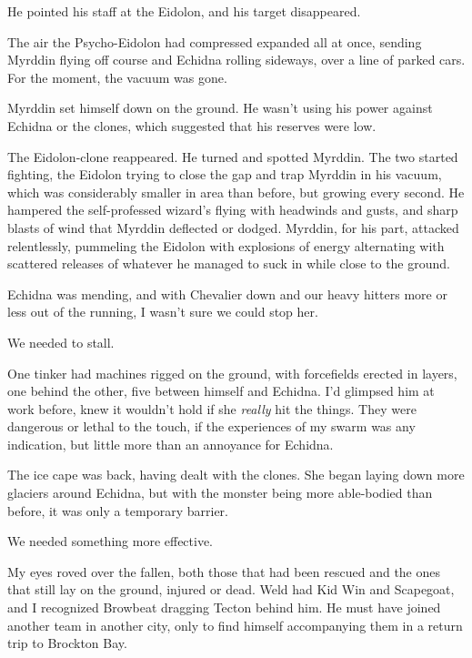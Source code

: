 He pointed his staff at the Eidolon, and his target disappeared.



The air the Psycho-Eidolon had compressed expanded all at once, sending Myrddin flying off course and Echidna rolling sideways, over a line of parked cars.  For the moment, the vacuum was gone.



Myrddin set himself down on the ground.  He wasn't using his power against Echidna or the clones, which suggested that his reserves were low.



The Eidolon-clone reappeared.  He turned and spotted Myrddin.  The two started fighting, the Eidolon trying to close the gap and trap Myrddin in his vacuum, which was considerably smaller in area than before, but growing every second.  He hampered the self-professed wizard's flying with headwinds and gusts, and sharp blasts of wind that Myrddin deflected or dodged.  Myrddin, for his part, attacked relentlessly, pummeling the Eidolon with explosions of energy alternating with scattered releases of whatever he managed to suck in while close to the ground.



Echidna was mending, and with Chevalier down and our heavy hitters more or less out of the running, I wasn't sure we could stop her.



We needed to stall.



One tinker had machines rigged on the ground, with forcefields erected in layers, one behind the other, five between himself and Echidna.  I'd glimpsed him at work before, knew it wouldn't hold if she \emph{really} hit the things.  They were dangerous or lethal to the touch, if the experiences of my swarm was any indication, but little more than an annoyance for Echidna.



The ice cape was back, having dealt with the clones.  She began laying down more glaciers around Echidna, but with the monster being more able-bodied than before, it was only a temporary barrier.



We needed something more effective.



My eyes roved over the fallen, both those that had been rescued and the ones that still lay on the ground, injured or dead.  Weld had Kid Win and Scapegoat, and I recognized Browbeat dragging Tecton behind him.  He must have joined another team in another city, only to find himself accompanying them in a return trip to Brockton Bay.



